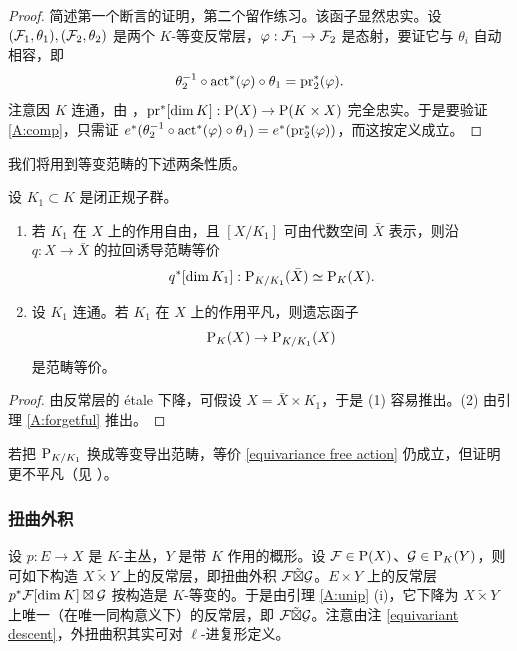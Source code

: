 \begin{proof}
简述第一个断言的证明，第二个留作练习。该函子显然忠实。设 $({\mathcal F}_1,\theta_1),({\mathcal F}_2,\theta_2)$ 是两个 $K$-等变反常层，$\varphi: {\mathcal F}_1\to {\mathcal F}_2$ 是态射，要证它与 $\theta_i$ 自动相容，即
\begin{equation}\label{A:comp}
\theta_2^{-1}\circ\operatorname{act}^*(\varphi)\circ\theta_1={\operatorname{pr}}_2^*(\varphi).
\end{equation}
注意因 $K$ 连通，由 \cite[Proposition 4.2.5]{BBD}，${\operatorname{pr}}^*[\dim K]: \operatorname{P}(X)\to \operatorname{P}(K\times X)$ 完全忠实。于是要验证 \eqref{A:comp}，只需证 $e^*(\theta_2^{-1}\circ\operatorname{act}^*(\varphi)\circ\theta_1)=e^*({\operatorname{pr}}_2^*(\varphi))$，而这按定义成立。
\end{proof}

我们将用到等变范畴的下述两条性质。

\begin{lem}\label{A:unip}
设 $K_1\subset K$ 是闭正规子群。
\begin{enumerate}
\item 若 $K_1$ 在 $X$ 上的作用自由，且 $[X/K_1]$ 可由代数空间 $\bar X$ 表示，则沿 $q:X\to \bar X$ 的拉回诱导范畴等价
\begin{equation}\label{equivariance free action}
q^*[\dim K_1]:\operatorname{P}_{K/K_1}(\bar X)\simeq \operatorname{P}_K(X).
\end{equation}

\item 设 $K_1$ 连通。若 $K_1$ 在 $X$ 上的作用平凡，则遗忘函子
\begin{equation}\label{unipotence}
\operatorname{P}_K(X)\to \operatorname{P}_{K/K_1}(X)
\end{equation}
是范畴等价。
\end{enumerate}
\end{lem}

\begin{proof}
由反常层的 \'etale 下降，可假设 $X=\bar X\times K_1$，于是 (1) 容易推出。(2) 由引理 \ref{A:forgetful} 推出。
\end{proof}

\begin{rmk}\label{equivariant descent}
若把 $\operatorname{P}_{K/K_1}$ 换成等变导出范畴，等价 \eqref{equivariance free action} 仍成立，但证明更不平凡（见 \cite[\S\ 2.6.2]{BeLu}）。
\end{rmk}

\subsubsection{扭曲外积}\label{A:twist product}
设 $p:E\to X$ 是 $K$-主丛，$Y$ 是带 $K$ 作用的概形。设 ${\mathcal F}\in\operatorname{P}(X)$、${\mathcal G}\in \operatorname{P}_K(Y)$，则可如下构造 $X\tilde\times Y$ 上的反常层，即扭曲外积 ${\mathcal F}\tilde\boxtimes{\mathcal G}$。$E\times Y$ 上的反常层 $p^*{\mathcal F}[\dim K]\boxtimes {\mathcal G}$ 按构造是 $K$-等变的。于是由引理 \ref{A:unip} (i)，它下降为 $X\tilde\times Y$ 上唯一（在唯一同构意义下）的反常层，即 ${\mathcal F}\tilde\boxtimes{\mathcal G}$。注意由注 \ref{equivariant descent}，外扭曲积其实可对 $\ell$-进复形定义。

